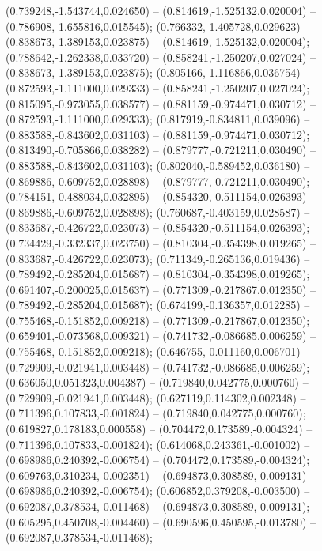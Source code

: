  (0.739248,-1.543744,0.024650) -- (0.814619,-1.525132,0.020004) -- (0.786908,-1.655816,0.015545);
 (0.766332,-1.405728,0.029623) -- (0.838673,-1.389153,0.023875) -- (0.814619,-1.525132,0.020004);
 (0.788642,-1.262338,0.033720) -- (0.858241,-1.250207,0.027024) -- (0.838673,-1.389153,0.023875);
 (0.805166,-1.116866,0.036754) -- (0.872593,-1.111000,0.029333) -- (0.858241,-1.250207,0.027024);
 (0.815095,-0.973055,0.038577) -- (0.881159,-0.974471,0.030712) -- (0.872593,-1.111000,0.029333);
 (0.817919,-0.834811,0.039096) -- (0.883588,-0.843602,0.031103) -- (0.881159,-0.974471,0.030712);
 (0.813490,-0.705866,0.038282) -- (0.879777,-0.721211,0.030490) -- (0.883588,-0.843602,0.031103);
 (0.802040,-0.589452,0.036180) -- (0.869886,-0.609752,0.028898) -- (0.879777,-0.721211,0.030490);
 (0.784151,-0.488034,0.032895) -- (0.854320,-0.511154,0.026393) -- (0.869886,-0.609752,0.028898);
 (0.760687,-0.403159,0.028587) -- (0.833687,-0.426722,0.023073) -- (0.854320,-0.511154,0.026393);
 (0.734429,-0.332337,0.023750) -- (0.810304,-0.354398,0.019265) -- (0.833687,-0.426722,0.023073);
 (0.711349,-0.265136,0.019436) -- (0.789492,-0.285204,0.015687) -- (0.810304,-0.354398,0.019265);
 (0.691407,-0.200025,0.015637) -- (0.771309,-0.217867,0.012350) -- (0.789492,-0.285204,0.015687);
 (0.674199,-0.136357,0.012285) -- (0.755468,-0.151852,0.009218) -- (0.771309,-0.217867,0.012350);
 (0.659401,-0.073568,0.009321) -- (0.741732,-0.086685,0.006259) -- (0.755468,-0.151852,0.009218);
 (0.646755,-0.011160,0.006701) -- (0.729909,-0.021941,0.003448) -- (0.741732,-0.086685,0.006259);
 (0.636050,0.051323,0.004387) -- (0.719840,0.042775,0.000760) -- (0.729909,-0.021941,0.003448);
 (0.627119,0.114302,0.002348) -- (0.711396,0.107833,-0.001824) -- (0.719840,0.042775,0.000760);
 (0.619827,0.178183,0.000558) -- (0.704472,0.173589,-0.004324) -- (0.711396,0.107833,-0.001824);
 (0.614068,0.243361,-0.001002) -- (0.698986,0.240392,-0.006754) -- (0.704472,0.173589,-0.004324);
 (0.609763,0.310234,-0.002351) -- (0.694873,0.308589,-0.009131) -- (0.698986,0.240392,-0.006754);
 (0.606852,0.379208,-0.003500) -- (0.692087,0.378534,-0.011468) -- (0.694873,0.308589,-0.009131);
 (0.605295,0.450708,-0.004460) -- (0.690596,0.450595,-0.013780) -- (0.692087,0.378534,-0.011468);
